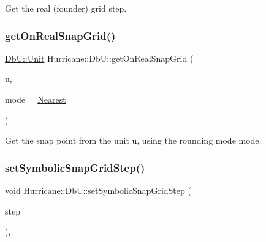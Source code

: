Get the real (founder) grid step. \mbox{\label{group__DbUGroup_ga8746e486f153aa37ee469c1604eba5c0}} 
\subsubsection{\texorpdfstring{get\+On\+Real\+Snap\+Grid()}{getOnRealSnapGrid()}}
{\footnotesize\ttfamily \hyperlink{group__DbUGroup_ga4fbfa3e8c89347af76c9628ea06c4146}{Db\+U\+::\+Unit} Hurricane\+::\+Db\+U\+::get\+On\+Real\+Snap\+Grid (\begin{DoxyParamCaption}\item[{\hyperlink{group__DbUGroup_ga4fbfa3e8c89347af76c9628ea06c4146}{Db\+U\+::\+Unit}}]{u,  }\item[{\hyperlink{group__DbUGroup_ga1082168d6f9956ebba22ab8bbec21637}{Db\+U\+::\+Snap\+Mode}}]{mode = {\ttfamily \hyperlink{group__DbUGroup_gga1082168d6f9956ebba22ab8bbec21637a65e6f47eb16779b8974a80d6145a2db5}{Nearest}} }\end{DoxyParamCaption})\hspace{0.3cm}{\ttfamily [static]}}

Get the snap point from the unit {\ttfamily u}, using the rounding mode {\ttfamily mode}. \mbox{\label{group__DbUGroup_ga9ccd423c8f268ef54770f4663e6c9304}} 
\subsubsection{\texorpdfstring{set\+Symbolic\+Snap\+Grid\+Step()}{setSymbolicSnapGridStep()}}
{\footnotesize\ttfamily void Hurricane\+::\+Db\+U\+::set\+Symbolic\+Snap\+Grid\+Step (\begin{DoxyParamCaption}\item[{\hyperlink{group__DbUGroup_ga4fbfa3e8c89347af76c9628ea06c4146}{Db\+U\+::\+Unit}}]{step }\end{DoxyParamCaption})\hspace{0.3cm}{\ttfamily [inline]}, {\ttfamily [static]}}

